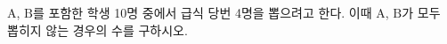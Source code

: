 \hspace*{2mm}\begin{minipage}[t]{\dimexpr\linewidth-2mm\relax}\vspace{0pt}
$\mathrm{A}$, $\mathrm{B}$를 포함한 학생 10명 중에서 급식 당번 4명을 뽑으려고 한다. 이때 $\mathrm{A}$, $\mathrm{B}$가 모두 뽑히지 않는 경우의 수를 구하시오.\end{minipage}
